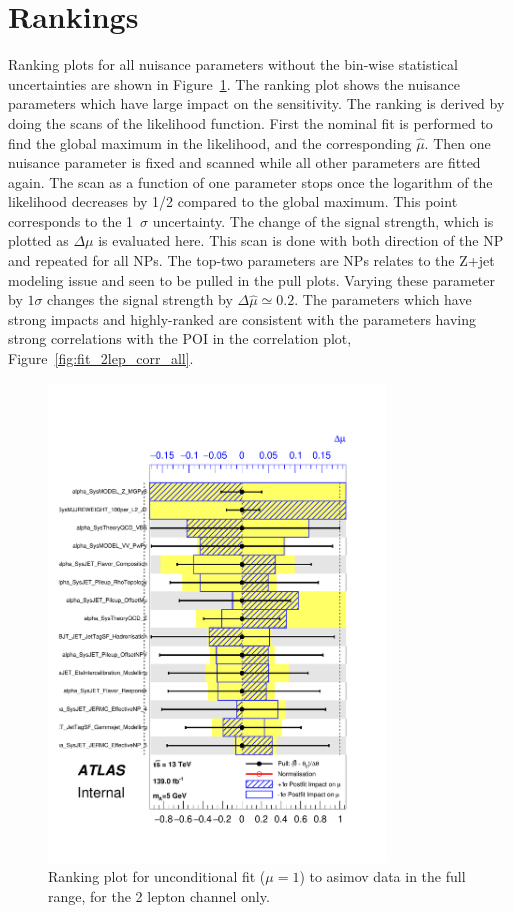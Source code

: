 \section{Rankings}
Ranking plots for all nuisance parameters without the bin-wise statistical uncertainties are shown in Figure~\ref{fig:fit_2lep_ranking_all}. The ranking plot shows the nuisance parameters which have large impact on the sensitivity. The ranking is derived by doing the scans of the likelihood function. First the nominal fit is performed to find the global maximum in the likelihood, and the corresponding $\hat{\mu}$. Then one nuisance parameter is fixed and scanned while all other parameters are fitted again. The scan as a function of one parameter stops once the logarithm of the likelihood decreases by 1/2 compared to the global maximum. This point corresponds to the 1~$\sigma$ uncertainty. The change of the signal strength, which is plotted as $\Delta\mu$ is evaluated here.
This scan is done with both direction of the NP and repeated for all NPs.
The top-two parameters are NPs relates to the Z+jet modeling issue and seen to be pulled in the pull plots. Varying these parameter by $1\sigma$ changes the signal strength by $\Delta \hat{\mu} \simeq 0.2$. The parameters which have strong impacts and highly-ranked are consistent with the parameters having strong correlations with the POI in the correlation plot, Figure~\ref{fig:fit_2lep_corr_all}.
\begin{figure}[ht]
      \centering
        \includegraphics[width=0.8\textwidth]{figures/2lep/FitResults/pulls_mu_SemileptonicVBS_5_AsimovAllbins.pdf}
        \caption{Ranking plot for unconditional fit ($\mu=1$) to asimov data in the full range, for the 2 lepton channel only.}
       \label{fig:fit_2lep_ranking_all}
\end{figure}

